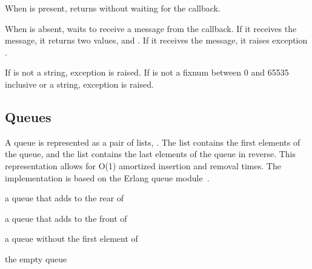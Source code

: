 When  is present,  returns
 without waiting for the callback.

When  is absent,  waits to receive a
message from the callback. If it receives the 
message, it returns two values,  and . If it receives
the  message, it raises exception
.

If  is not a string, exception  is raised. If  is not a
fixnum between 0 and 65535 inclusive or a string, exception
 is raised.

\subsection {Queues}

A queue is represented as a pair of lists,
. The  list contains the first
elements of the queue, and the  list contains the last
elements of the queue in reverse. This representation allows for O(1)
amortized insertion and removal times. The implementation is based on
the Erlang queue module~\cite{queue-ref}.

\begin{procedure}
\end{procedure}
\returns{} a queue that adds  to the rear of 

\begin{procedure}
\end{procedure}
\returns{} a queue that adds  to the front of 

\begin{procedure}
\end{procedure}
\returns{} a queue without the first element of 

\begin{syntax}
\end{syntax}
\returns{} the empty queue

